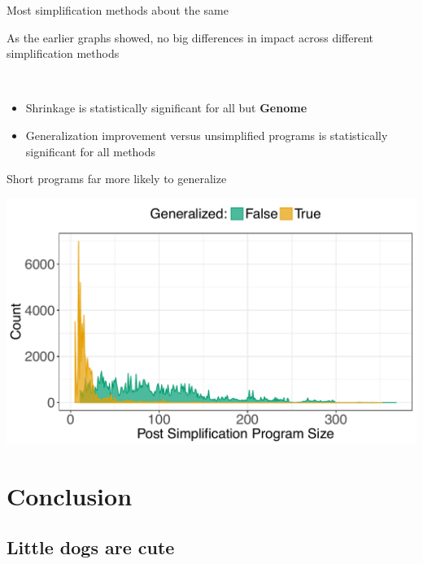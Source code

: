 \documentclass{beamer}
\begin{document}
\begin{frame}{Most simplification methods about the same}

As the earlier graphs showed, no big differences in impact across different simplification methods

~

\begin{itemize}
	\item Shrinkage is statistically significant for all but \textbf{Genome}
	\item Generalization improvement versus unsimplified programs is statistically significant for all methods
\end{itemize}


\end{frame}

\begin{frame}{Short programs far more likely to generalize}
\begin{center}
	\includegraphics[width=0.9\linewidth]{Illustrations/Size_Density_final}
\end{center}

\end{frame}

\section{Conclusion}

\subsection*{Little dogs are cute}
\end{document}
